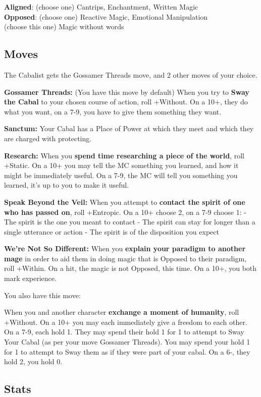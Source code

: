 \documentclass[
  oneside,
  statementpaper,
  9pt]{memoir}
\begin{document}
\textbf{Aligned}: (choose one) Cantrips, Enchantment, Written Magic\\
\textbf{Opposed}: (choose one) Reactive Magic, Emotional Manipulation\\
(choose this one) Magic without words

\hypertarget{moves}{%
\subsection{Moves}\label{moves}}

The Cabalist gets the Gossamer Threads move, and 2 other moves of your
choice.

\textbf{Gossamer Threads:} (You have this move by default) When you try
to \textbf{Sway the Cabal} to your chosen course of action, roll
+Without. On a 10+, they do what you want, on a 7-9, you have to give
them something they want.

\textbf{Sanctum:} Your Cabal has a Place of Power at which they meet and
which they are charged with protecting.

\textbf{Research:} When you \textbf{spend time researching a piece of
the world}, roll +Static. On a 10+ you may tell the MC something you
learned, and how it might be immediately useful. On a 7-9, the MC will
tell you something you learned, it's up to you to make it useful.

\textbf{Speak Beyond the Veil:} When you attempt to \textbf{contact the
spirit of one who has passed on}, roll +Entropic. On a 10+ choose 2, on
a 7-9 choose 1: - The spirit is the one you meant to contact - The
spirit can stay for longer than a single utterance or action - The
spirit is of the disposition you expect

\textbf{We're Not So Different:} When you \textbf{explain your paradigm
to another mage} in order to aid them in doing magic that is Opposed to
their paradigm, roll +Within. On a hit, the magic is not Opposed, this
time. On a 10+, you both mark experience.

You also have this move:

When you and another character \textbf{exchange a moment of humanity},
roll +Without. On a 10+ you may each immediately give a freedom to each
other. On a 7-9, each hold 1. They may spend their hold 1 for 1 to
attempt to Sway Your Cabal (as per your move Gossamer Threads). You may
spend your hold 1 for 1 to attempt to Sway them as if they were part of
your cabal. On a 6-, they hold 2, you hold 0.

\hypertarget{stats-2}{%
\subsection{Stats}\label{stats-2}}
\end{document}
